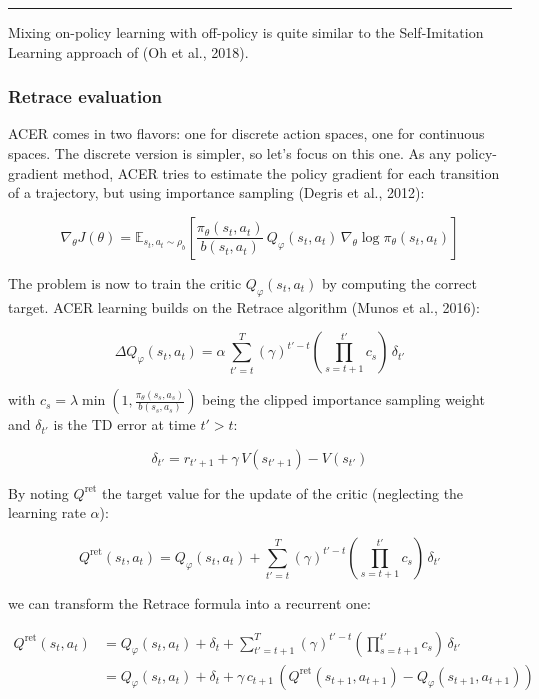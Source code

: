 \documentclass[
  letterpaper,
  DIV=11,
  numbers=noendperiod]{scrreprt}
\begin{document}
\begin{center}\rule{0.5\linewidth}{0.5pt}\end{center}

Mixing on-policy learning with off-policy is quite similar to the
Self-Imitation Learning approach of (Oh et al., 2018).

\hypertarget{retrace-evaluation}{%
\subsubsection*{Retrace evaluation}\label{retrace-evaluation}}

ACER comes in two flavors: one for discrete action spaces, one for
continuous spaces. The discrete version is simpler, so let's focus on
this one. As any policy-gradient method, ACER tries to estimate the
policy gradient for each transition of a trajectory, but using
importance sampling (Degris et al., 2012):

\[
    \nabla_\theta J(\theta)  = \mathbb{E}_{s_t, a_t \sim \rho_b} [\frac{\pi_\theta(s_t, a_t)}{b(s_t, a_t)} \, Q_\varphi(s_t, a_t) \, \nabla_\theta \log \pi_\theta(s_t, a_t)]
\]

The problem is now to train the critic \(Q_\varphi(s_t, a_t)\) by
computing the correct target. ACER learning builds on the Retrace
algorithm (Munos et al., 2016):

\[
    \Delta Q_\varphi(s_t, a_t) = \alpha \, \sum_{t'=t}^T (\gamma)^{t'-t} \left(\prod_{s=t+1}^{t'} c_s \right) \, \delta_{t'}
\]

with
\(c_s = \lambda \min (1, \frac{\pi_\theta(s_s, a_s)}{b(s_s, a_s)})\)
being the clipped importance sampling weight and \(\delta_{t'}\) is the
TD error at time \(t'>t\):

\[
    \delta_{t'} = r_{t'+1} + \gamma \, V(s_{t'+1}) - V(s_{t'})
\]

By noting \(Q^\text{ret}\) the target value for the update of the critic
(neglecting the learning rate \(\alpha\)):

\[
    Q^\text{ret}(s_t, a_t) = Q_\varphi(s_t, a_t) +  \sum_{t'=t}^T (\gamma)^{t'-t} \left(\prod_{s=t+1}^{t'} c_s \right) \, \delta_{t'}
\]

we can transform the Retrace formula into a recurrent one:

\[
\begin{aligned}
    Q^\text{ret}(s_t, a_t) & = Q_\varphi(s_t, a_t) + \delta_t + \sum_{t'=t+1}^T (\gamma)^{t'-t} \left(\prod_{s=t+1}^{t'} c_s \right) \, \delta_{t'} \\
    & = Q_\varphi(s_t, a_t) + \delta_t + \gamma \, c_{t+1} \, (Q^\text{ret}(s_{t+1}, a_{t+1}) - Q_\varphi(s_{t+1}, a_{t+1})) \\
\end{aligned}
\]
\end{document}
